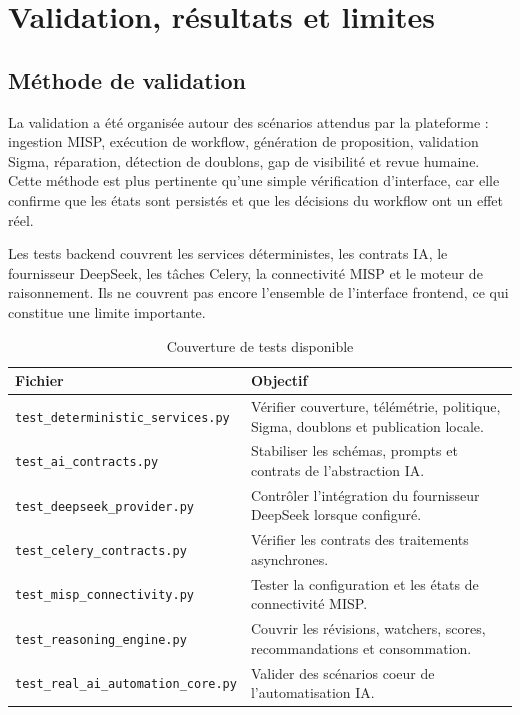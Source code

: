 \chapter{Validation, résultats et limites}

\section{Méthode de validation}

La validation a été organisée autour des scénarios attendus par la plateforme : ingestion MISP, exécution de workflow, génération de proposition, validation Sigma, réparation, détection de doublons, gap de visibilité et revue humaine. Cette méthode est plus pertinente qu'une simple vérification d'interface, car elle confirme que les états sont persistés et que les décisions du workflow ont un effet réel.

Les tests backend couvrent les services déterministes, les contrats IA, le fournisseur DeepSeek, les tâches Celery, la connectivité MISP et le moteur de raisonnement. Ils ne couvrent pas encore l'ensemble de l'interface frontend, ce qui constitue une limite importante.

\begin{longtable}{p{5cm}p{9cm}}
\caption{Couverture de tests disponible}
\label{tab:tests}\\
\toprule
\textbf{Fichier} & \textbf{Objectif}\\
\midrule
\texttt{test\_deterministic\_services.py} & Vérifier couverture, télémétrie, politique, Sigma, doublons et publication locale.\\
\texttt{test\_ai\_contracts.py} & Stabiliser les schémas, prompts et contrats de l'abstraction IA.\\
\texttt{test\_deepseek\_provider.py} & Contrôler l'intégration du fournisseur DeepSeek lorsque configuré.\\
\texttt{test\_celery\_contracts.py} & Vérifier les contrats des traitements asynchrones.\\
\texttt{test\_misp\_connectivity.py} & Tester la configuration et les états de connectivité MISP.\\
\texttt{test\_reasoning\_engine.py} & Couvrir les révisions, watchers, scores, recommandations et consommation.\\
\texttt{test\_real\_ai\_automation\_core.py} & Valider des scénarios coeur de l'automatisation IA.\\
\bottomrule
\end{longtable}

